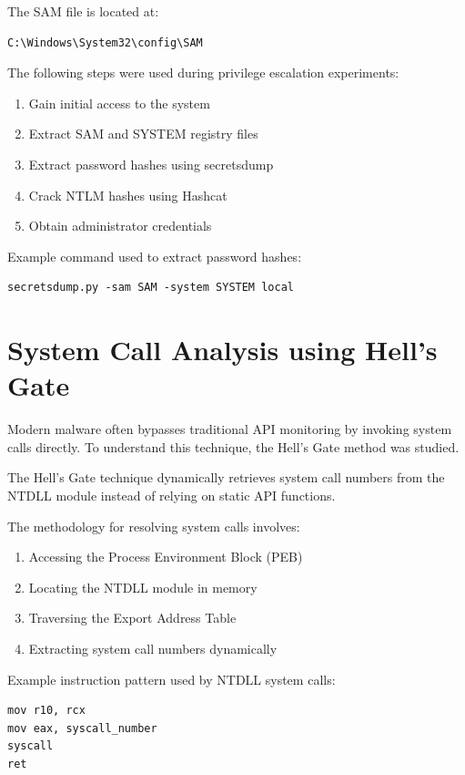 The SAM file is located at:

\begin{verbatim}
C:\Windows\System32\config\SAM
\end{verbatim}

The following steps were used during privilege escalation experiments:

\begin{enumerate}
\item Gain initial access to the system
\item Extract SAM and SYSTEM registry files
\item Extract password hashes using secretsdump
\item Crack NTLM hashes using Hashcat
\item Obtain administrator credentials
\end{enumerate}

Example command used to extract password hashes:

\begin{verbatim}
secretsdump.py -sam SAM -system SYSTEM local
\end{verbatim}

\section{System Call Analysis using Hell's Gate}

Modern malware often bypasses traditional API monitoring by invoking system calls directly. 
To understand this technique, the Hell's Gate method was studied.

The Hell's Gate technique dynamically retrieves system call numbers from the NTDLL module 
instead of relying on static API functions.

The methodology for resolving system calls involves:

\begin{enumerate}
\item Accessing the Process Environment Block (PEB)
\item Locating the NTDLL module in memory
\item Traversing the Export Address Table
\item Extracting system call numbers dynamically
\end{enumerate}

Example instruction pattern used by NTDLL system calls:

\begin{verbatim}
mov r10, rcx
mov eax, syscall_number
syscall
ret
\end{verbatim}

